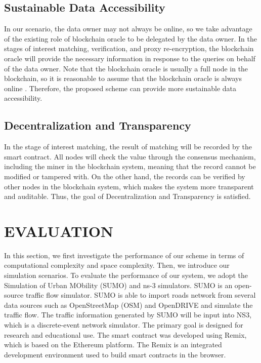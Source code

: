 \documentclass[journal]{IEEEtran}
\begin{document}
    \subsection{Sustainable Data Accessibility}
    
    In our scenario, the data owner may not always be online, so we take advantage of the existing role of blockchain oracle to be delegated by the data owner. In the stages of interest matching, verification, and proxy re-encryption, the blockchain oracle will provide the necessary information in response to the queries on behalf of the data owner. Note that the blockchain oracle is usually a full node in the blockchain, so it is reasonable to assume that the blockchain oracle is always online . Therefore, the proposed scheme can provide more sustainable data accessibility. 

    \subsection{Decentralization and Transparency}
    
    In the stage of interest matching, the result of matching will be recorded by the smart contract. All nodes will check the value through the consensus mechanism, including the miner in the blockchain system, meaning that the record cannot be modified or tampered with. On the other hand, the records can be verified by other nodes in the blockchain system, which makes the system more transparent and auditable. Thus, the goal of Decentralization and Transparency is satisfied.



    \section{EVALUATION}
    
    In this section, we first investigate the performance of our scheme in terms of computational complexity and space complexity. Then, we introduce our simulation scenarios. To evaluate the performance of our system, we adopt the Simulation of Urban MObility (SUMO)\cite{sumo} and ns-3 \cite{ns3} simulators. SUMO is an open-source traffic flow simulator. SUMO is able to import roads network from several data sources such as OpenStreetMap (OSM) and OpenDRIVE and simulate the traffic flow. The traffic information generated by SUMO will be input into NS3, which is a discrete-event network simulator. The   primary goal is designed for research and educational use. The smart contract was developed using Remix, which is based on the Ethereum platform. The Remix is an integrated development environment used to build smart contracts in the browser. 
\end{document}
